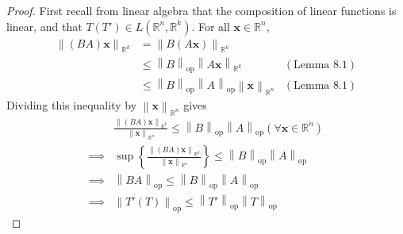 \documentclass{article}
\newcommand{\R}{\mathbb{R}}
\newcommand{\x}{\mathbf{x}}
\newcommand{\norm}[1]{\left\lVert#1\right\rVert}
\newcommand{\normop}[1]{\left\lVert#1\right\rVert_\text{op}}
\theoremstyle{definition}
\begin{document}
	\begin{proof}
		First recall from linear algebra that the composition of linear functions is linear, and that $ T(T')\in L(\R^n,\R^k) $.  For all $ \x\in \R^n $,  
		\begin{align*}
			\norm{(BA)\x}_{\R^k} &= \norm{B(A\x)}_{\R^k} \\ 
			&  \le \normop{B} \norm{A\x}_{\R^k} & (\text{Lemma }8.1) \\ 
			& \le \normop{B}\normop{A}\norm{\x}_{\R^n} & (\text{Lemma }8.1)
		\end{align*}
		Dividing this inequality by $ \norm{\x}_{\R^n} $ gives
		\begin{align*}
			&\frac{\norm{(BA)\x}_{\R^k}}{ \norm{\x}_{\R^n}}   \le \normop{B}\normop{A} (\forall\x\in\R^n)  \\\implies & \sup\left\{\frac{\norm{(BA)\x}_{\R^k}}{ \norm{\x}_{\R^n}}\right\} \le \normop{B}\normop{A} \\ 
			\implies& \normop{BA} \le \normop{B}\normop{A} \\
			\implies &\normop{T'(T)} \le \normop{T'}\normop{T}
		\end{align*}
	\end{proof}
	
\end{document}

